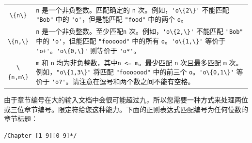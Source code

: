 \documentclass[doctor,openright,twoside]{sjtuthesis}
\newcommand{\passthrough}[1]{#1}
\theoremstyle{plain}
\theoremstyle{definition}
\theoremstyle{remark}
\theoremstyle{ocrenumbox}
\theoremstyle{plain}
\begin{document}
\begin{longtable}[]{@{}cl@{}}
\begin{minipage}[t]{0.23\columnwidth}\centering
\passthrough{\lstinline!\{n\}!}\strut
\end{minipage} & \begin{minipage}[t]{0.72\columnwidth}\raggedright
\passthrough{\lstinline!n!} 是一个非负整数。匹配确定的 \passthrough{\lstinline!n!} 次。例如，\passthrough{\lstinline!'o\{2\}'!} 不能匹配 \passthrough{\lstinline!"Bob"!} 中的 \passthrough{\lstinline!'o'!}，但是能匹配 \passthrough{\lstinline!"food"!} 中的两个 \passthrough{\lstinline!o!}。\strut
\end{minipage}\tabularnewline
\begin{minipage}[t]{0.23\columnwidth}\centering
\passthrough{\lstinline!\{n,\}!}\strut
\end{minipage} & \begin{minipage}[t]{0.72\columnwidth}\raggedright
\passthrough{\lstinline!n!} 是一个非负整数。至少匹配\passthrough{\lstinline!n!} 次。例如，\passthrough{\lstinline!'o\{2,\}'!} 不能匹配 \passthrough{\lstinline!"Bob"!} 中的 \passthrough{\lstinline!'o'!}，但能匹配 \passthrough{\lstinline!"foooood"!} 中的所有 \passthrough{\lstinline!o!}。\passthrough{\lstinline!'o\{1,\}'!} 等价于 \passthrough{\lstinline!'o+'!}。\passthrough{\lstinline!'o\{0,\}'!} 则等价于 \passthrough{\lstinline!'o*'!}。\strut
\end{minipage}\tabularnewline
\begin{minipage}[t]{0.23\columnwidth}\centering
\passthrough{\lstinline!\{n,m\}!}\strut
\end{minipage} & \begin{minipage}[t]{0.72\columnwidth}\raggedright
\passthrough{\lstinline!m!} 和 \passthrough{\lstinline!n!} 均为非负整数，其中\passthrough{\lstinline!n <= m!}。最少匹配 \passthrough{\lstinline!n!} 次且最多匹配 \passthrough{\lstinline!m!} 次。例如，\passthrough{\lstinline!"o\{1,3\}"!} 将匹配 \passthrough{\lstinline!"fooooood"!} 中的前三个 \passthrough{\lstinline!o!}。\passthrough{\lstinline!'o\{0,1\}'!} 等价于 \passthrough{\lstinline!'o?'!}。请注意在逗号和两个数之间不能有空格。\strut
\end{minipage}\tabularnewline
\bottomrule
\end{longtable}

由于章节编号在大的输入文档中会很可能超过九，所以您需要一种方式来处理两位或三位章节编号。限定符给您这种能力。下面的正则表达式匹配编号为任何位数的章节标题：

\passthrough{\lstinline!/Chapter [1-9][0-9]*/!}
\end{document}
